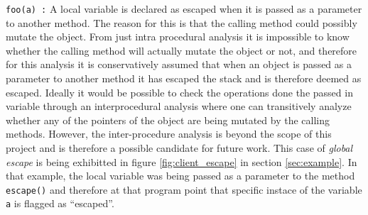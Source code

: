 \texttt{foo(a) :} A local variable is declared as escaped when it is passed as a parameter to another method. The reason for this is that the calling method could possibly mutate the object. From just intra procedural analysis it is impossible to know whether the calling method will actually mutate the object or not, and therefore for this analysis it is conservatively assumed that when an object is passed as a parameter to another method it has escaped the stack and is therefore deemed as escaped. Ideally it would be possible to check the operations done the passed in variable through an interprocedural analysis where one can transitively analyze whether any of the pointers of the object are being mutated by the calling methods. However, the inter-procedure analysis is beyond the scope of this project and is therefore a possible candidate for future work. This case of \textit{global escape} is being exhibitted in figure \ref{fig:client_escape} in section \ref{sec:example}. In that example, the local variable was being passed as a parameter to the method \texttt{escape()} and therefore at that program point that specific instace of the variable \texttt{a} is flagged as ``escaped''.

